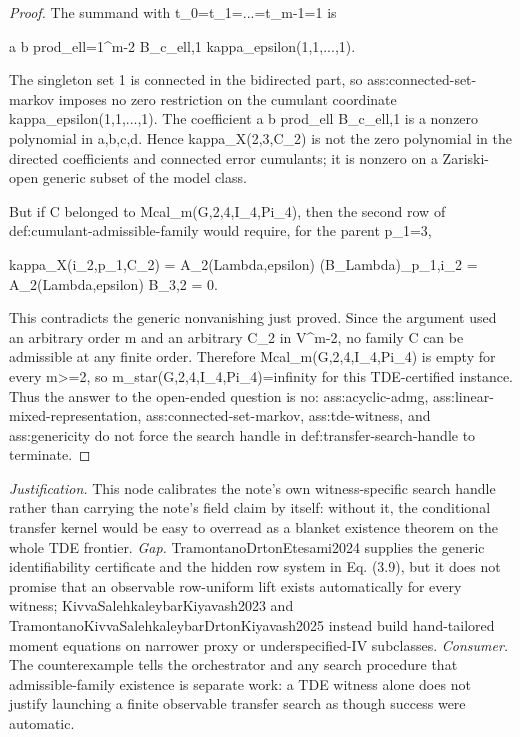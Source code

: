 \documentclass{article}
\begin{document}
\begin{proof}
The summand with t_0=t_1=...=t_{m-1}=1 is

a b prod_{ell=1}^{m-2} B_{c_ell,1} kappa_epsilon(1,1,...,1).

The singleton set {1} is connected in the bidirected part, so ass:connected-set-markov imposes no zero restriction on the cumulant coordinate kappa_epsilon(1,1,...,1). The coefficient a b prod_ell B_{c_ell,1} is a nonzero polynomial in a,b,c,d. Hence kappa_X(2,3,C_2) is not the zero polynomial in the directed coefficients and connected error cumulants; it is nonzero on a Zariski-open generic subset of the model class.

But if C belonged to Mcal_m(G,2,4,I_4,Pi_4), then the second row of def:cumulant-admissible-family would require, for the parent p_1=3,

kappa_X(i_2,p_1,C_2) = A_2(Lambda,epsilon) (B_Lambda)_{p_1,i_2} = A_2(Lambda,epsilon) B_{3,2} = 0.

This contradicts the generic nonvanishing just proved. Since the argument used an arbitrary order m and an arbitrary C_2 in V^{m-2}, no family C can be admissible at any finite order. Therefore Mcal_m(G,2,4,I_4,Pi_4) is empty for every m>=2, so m_star(G,2,4,I_4,Pi_4)=infinity for this TDE-certified instance. Thus the answer to the open-ended question is no: ass:acyclic-admg, ass:linear-mixed-representation, ass:connected-set-markov, ass:tde-witness, and ass:genericity do not force the search handle in def:transfer-search-handle to terminate.
\end{proof}
\par\smallskip\noindent \textit{Justification.} This node calibrates the note's own witness-specific search handle rather than carrying the note's field claim by itself: without it, the conditional transfer kernel would be easy to overread as a blanket existence theorem on the whole TDE frontier. \textit{Gap.} TramontanoDrtonEtesami2024 supplies the generic identifiability certificate and the hidden row system in Eq. (3.9), but it does not promise that an observable row-uniform lift exists automatically for every witness; KivvaSalehkaleybarKiyavash2023 and TramontanoKivvaSalehkaleybarDrtonKiyavash2025 instead build hand-tailored moment equations on narrower proxy or underspecified-IV subclasses. \textit{Consumer.} The counterexample tells the orchestrator and any search procedure that admissible-family existence is separate work: a TDE witness alone does not justify launching a finite observable transfer search as though success were automatic.
\end{document}
